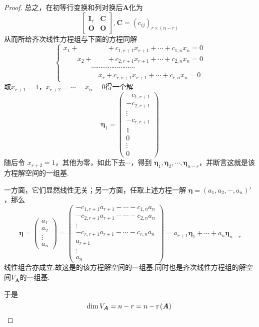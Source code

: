 {\begin{proof}
    总之，在初等行变换和列对换后$\bm{A}$化为
    \[
        \begin{bmatrix}
            \bm{I}_r & \bm{C} \\\bm{O} & \bm{O}
        \end{bmatrix}
        ,\bm{C}=\left(c_{ij}\right)_{r\times \left(n-r\right)}
    \]
    从而所给齐次线性方程组与下面的方程同解
    \[
        \begin{cases*}
            x_1+\qquad \qquad +c_{1,r+1}x_{r+1}+\cdots+c_{1,n}x_n=0      \\
            \qquad x_2+\qquad +c_{2,r+1}x_{r+1}+\cdots+c_{2,n}x_n=0      \\
            \qquad\qquad\cdots\cdots\cdots\cdots\cdots\cdots\cdots\cdots \\
            \qquad\qquad \quad x_r+c_{r,r+1}x_{r+1}+\cdots+c_{r,n}x_n=0
        \end{cases*}
    \]
    取$x_{r+1}=1$，$x_{r+2}=\cdots=x_n=0$得一个解
    \[
        \bm{\eta}_1=\begin{pmatrix}
            -c_{1,r+1} \\
            -c_{2,r+1} \\
            \vdots     \\
            -c_{r,r+1} \\
            1          \\
            0          \\
            \vdots     \\
            0
        \end{pmatrix}
    \]
    随后令
    $x_{r+2}=1$，其他为零，如此下去$\cdots$，得到
    $\bm{\eta}_1,\bm{\eta}_2,\cdots,\bm{\eta}_{n-r}
    $，并断言这就是该方程解空间的一组基.

    一方面，它们显然线性无关；另一方面，任取上述方程一解
    $\bm{\eta}=\left(a_1,a_2,\cdots,a_n\right)
        '$，那么
    \[
        \bm{\eta}=\begin{pmatrix}
            a_1 \\a_2\\\vdots\\a_n
        \end{pmatrix}
        =\begin{pmatrix}
            -c_{1,r+1}a_{r+1}-\cdots-c_{1,n}a_n \\
            -c_{2,r+1}a_{r+1}-\cdots-c_{2,n}a_n \\
            \vdots                              \\
            -c_{r,r+1}a_{r+1}-\cdots-c_{r,n}a_n \\
            a_{r+1}                             \\
            \vdots                              \\
            a_n
        \end{pmatrix}=a_{r+1}\bm{\eta}_1+\cdots+a_n\bm{\eta}
        _{n-r}
    \]
    线性组合亦成立.故这是的该方程解空间的一组基.同时也是齐次线性方程组的解空间$V_{\bm{A}}$的一组基.

    于是
    \[
        \dim V_{\bm{A}}=n-r=n-\mathrm{r} \left(\bm{A}
        \right)
        \qedhere
    \]
\end{proof}
}
